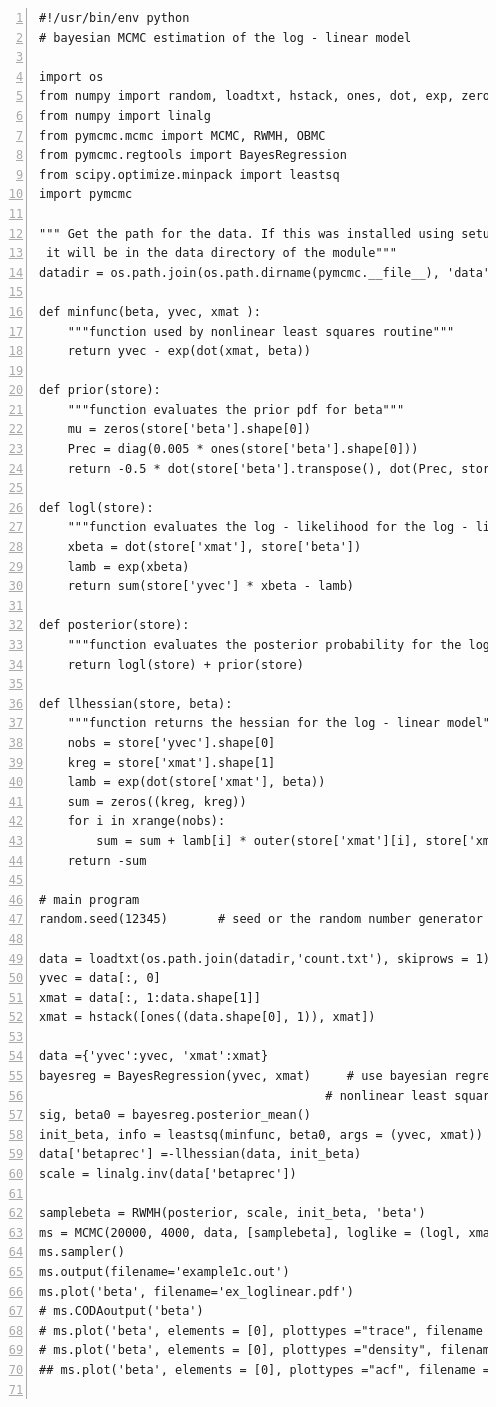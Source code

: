 \documentclass[article]{jss}
\begin{document}
\begin{lstlisting}[basicstyle={\scriptsize},numbers=left]
#!/usr/bin/env python
# bayesian MCMC estimation of the log - linear model

import os
from numpy import random, loadtxt, hstack, ones, dot, exp, zeros, outer, diag
from numpy import linalg
from pymcmc.mcmc import MCMC, RWMH, OBMC
from pymcmc.regtools import BayesRegression
from scipy.optimize.minpack import leastsq
import pymcmc

""" Get the path for the data. If this was installed using setup.py
 it will be in the data directory of the module"""
datadir = os.path.join(os.path.dirname(pymcmc.__file__), 'data')

def minfunc(beta, yvec, xmat ):
    """function used by nonlinear least squares routine"""
    return yvec - exp(dot(xmat, beta))

def prior(store):
    """function evaluates the prior pdf for beta"""
    mu = zeros(store['beta'].shape[0])
    Prec = diag(0.005 * ones(store['beta'].shape[0]))
    return -0.5 * dot(store['beta'].transpose(), dot(Prec, store['beta']))

def logl(store):
    """function evaluates the log - likelihood for the log - linear model"""
    xbeta = dot(store['xmat'], store['beta'])
    lamb = exp(xbeta)
    return sum(store['yvec'] * xbeta - lamb)

def posterior(store):
    """function evaluates the posterior probability for the log - linear model"""
    return logl(store) + prior(store)

def llhessian(store, beta):
    """function returns the hessian for the log - linear model"""
    nobs = store['yvec'].shape[0]
    kreg = store['xmat'].shape[1]
    lamb = exp(dot(store['xmat'], beta))
    sum = zeros((kreg, kreg))
    for i in xrange(nobs):
        sum = sum + lamb[i] * outer(store['xmat'][i], store['xmat'][i])
    return -sum

# main program
random.seed(12345)       # seed or the random number generator

data = loadtxt(os.path.join(datadir,'count.txt'), skiprows = 1)    # loads data from file
yvec = data[:, 0]
xmat = data[:, 1:data.shape[1]]
xmat = hstack([ones((data.shape[0], 1)), xmat])

data ={'yvec':yvec, 'xmat':xmat} 
bayesreg = BayesRegression(yvec, xmat)     # use bayesian regression to initialise
                                        # nonlinear least squares algorithm
sig, beta0 = bayesreg.posterior_mean()
init_beta, info = leastsq(minfunc, beta0, args = (yvec, xmat))
data['betaprec'] =-llhessian(data, init_beta)
scale = linalg.inv(data['betaprec'])

samplebeta = RWMH(posterior, scale, init_beta, 'beta')
ms = MCMC(20000, 4000, data, [samplebeta], loglike = (logl, xmat.shape[1], 'yvec'))
ms.sampler()
ms.output(filename='example1c.out') 
ms.plot('beta', filename='ex_loglinear.pdf')
# ms.CODAoutput('beta')
# ms.plot('beta', elements = [0], plottypes ="trace", filename ="xx.pdf")
# ms.plot('beta', elements = [0], plottypes ="density", filename ="xx.png")
## ms.plot('beta', elements = [0], plottypes ="acf", filename ="yy.ps")


\end{lstlisting}
\end{document}
